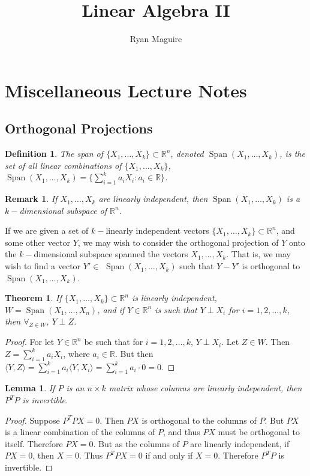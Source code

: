 \documentclass{article}
\title{Linear Algebra II}
\author{Ryan Maguire}
\date{\vspace{-5ex}}
\theoremstyle{mystyle}
\newtheorem{theorem}{Theorem}[section]
\newtheorem{definition}{Definition}[section]
\newtheorem{lemma}{Lemma}[section]
\newtheorem{remark}{Remark}[section]
\DeclareMathOperator{\Span}{Span}
\begin{document}
\maketitle
\tableofcontents

\section{Miscellaneous Lecture Notes}
\subsection{Orthogonal Projections}
\begin{definition}
The span of $\{X_{1},\hdots, X_{k}\} \subset \mathbb{R}^n$, denoted $\Span(X_{1},\hdots,X_{k})$, is the set of all linear combinations of $\{X_1,\hdots,X_{k}\}$, $\Span(X_{1},\hdots,X_{k})=\{\sum_{i=1}^{k} a_i X_i: a_i \in \mathbb{R}\}$.
\end{definition}
\begin{remark}
If $X_1,\hdots, X_k$ are linearly independent, then $\Span(X_1,\hdots, X_k)$ is a $k-$dimensional subspace of $\mathbb{R}^n$.
\end{remark}
If we are given a set of $k-$linearly independent vectors $\{X_1,\hdots, X_k\}\subset\mathbb{R}^n$, and some other vector $Y$, we may wish to consider the orthogonal projection of $Y$ onto the $k-$dimensional subspace spanned the vectors $X_1,\hdots, X_k$. That is, we may wish to find a vector $Y'\in$ $\Span(X_1,\hdots, X_k)$ such that $Y-Y'$ is orthogonal to $\Span(X_1,\hdots, X_k)$.
\begin{theorem}
If $\{X_1,\hdots, X_k\}\subset\mathbb{R}^n$ is linearly independent, $W = \Span(X_1,\hdots, X_n)$, and if $Y\in \mathbb{R}^n$ is such that $Y\perp X_i$ for $i=1,2,\hdots, k$, then $\forall_{Z\in W}$, $Y\perp Z$.
\end{theorem}
\begin{proof}
For let $Y\in \mathbb{R}^n$ be such that for $i=1,2,\hdots, k$, $Y\perp X_i$. Let $Z\in W$. Then $Z= \sum_{i=1}^{k} a_i X_i$, where $a_i\in \mathbb{R}$. But then $\langle Y, Z\rangle = \sum_{i=1}^{k} a_i \langle Y, X_i\rangle = \sum_{i=1}^{k} a_i\cdot 0 = 0$. 
\end{proof}
\begin{lemma}
If $P$ is an $n\times k$ matrix whose columns are linearly independent, then $P^TP$ is invertible.
\end{lemma}
\begin{proof}
Suppose $P^TPX = 0$. Then $PX$ is orthogonal to the columns of $P$. But $PX$ is a linear combination of the columns of $P$, and thus $PX$ must be orthogonal to itself. Therefore $PX = 0$. But as the columns of $P$ are linearly independent, if $PX = 0$, then $X=0$. Thus $P^TPX = 0$ if and only if $X=0$. Therefore $P^TP$ is invertible.
\end{proof}
\end{document}
